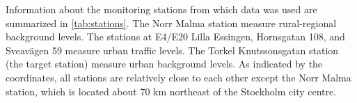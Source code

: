 \label{chapt:appendix_A}
Information about the monitoring stations from which data was used are summarized in \vref{tab:stations}. The Norr Malma station measure rural-regional background levels. The stations at E4/E20 Lilla Essingen, Hornsgatan 108, and Sveavägen 59 measure urban traffic levels. The Torkel Knutssonsgatan station (the target station) measure urban background levels. As indicated by the coordinates, all stations are relatively close to each other except the Norr Malma station, which is located about 70 km northeast of the Stockholm city centre. 
\begin{table}[h]
\centering
\caption{Monitoring stations.}
\label{tab:stations}
\end{table}


\pagebreak %